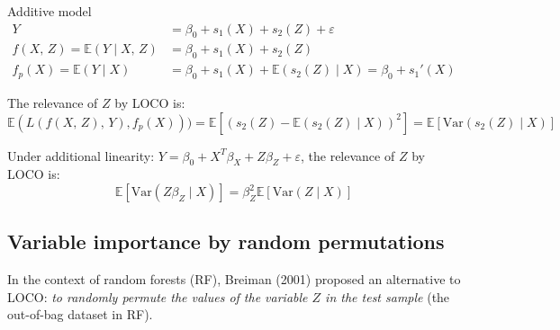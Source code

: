 \begin{example}{Additive model}{}
	\begin{align*}
		Y                                   & = \beta_0 + s_1(X) + s_2(Z) + \varepsilon      \\[0.5em]
		f(X,\,Z) = \mathds{E}(Y \mid X,\,Z) & = \beta_0 + s_1(X) + s_2(Z)                    \\
		f_p(X) = \mathds{E}(Y \mid X)       & = \beta_0 + s_1(X) + \mathds{E}(s_2(Z) \mid X)
		= \beta_0 + s_1'(X)
	\end{align*}

	The relevance of $Z$ by LOCO is:
	\begin{equation*}
		\mathds{E}(L(f(X,\,Z),\,Y),f_p(X))) = \mathds{E} \left[ (s_2(Z) - \mathds{E}(s_2(Z) \mid X))^2 \right]
		= \mathds{E} \left[ \text{Var}(s_2(Z) \mid X)\right]
	\end{equation*}

	\tcbline

	Under additional linearity: $Y = \beta_0 + X^T\beta_X + Z\beta_Z + \varepsilon$,
	the relevance of $Z$ by LOCO is:
	\begin{equation*}
		\mathds{E}\left[ \text{Var}(Z \beta_Z \mid X)\right] = \beta_Z^2 \mathds{E}\left[ \text{Var}(Z \mid X)\right]
	\end{equation*}
\end{example}


\subsection{Variable importance by random permutations}

In the context of random forests (RF), Breiman (2001) proposed an
alternative to LOCO:
\emph{to randomly permute the values of the variable $Z$ in the test sample}
(the out-of-bag dataset in RF).

